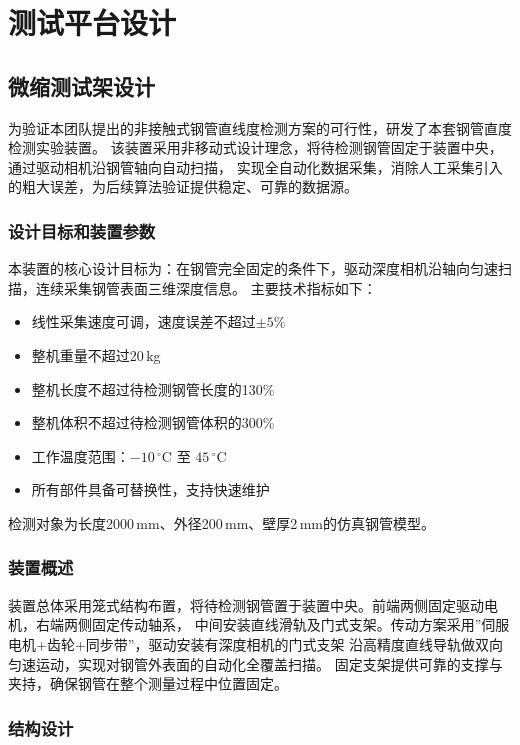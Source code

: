 \documentclass{article}
\begin{document}
\section{测试平台设计}

\subsection{微缩测试架设计}
为验证本团队提出的非接触式钢管直线度检测方案的可行性，研发了本套钢管直度检测实验装置。
该装置采用非移动式设计理念，将待检测钢管固定于装置中央，通过驱动相机沿钢管轴向自动扫描，
实现全自动化数据采集，消除人工采集引入的粗大误差，为后续算法验证提供稳定、可靠的数据源。

\subsubsection{设计目标和装置参数}

本装置的核心设计目标为：在钢管完全固定的条件下，驱动深度相机沿轴向匀速扫描，连续采集钢管表面三维深度信息。
主要技术指标如下：

\begin{itemize}
    \item 线性采集速度可调，速度误差不超过$\pm5\%$
    \item 整机重量不超过20\,kg
    \item 整机长度不超过待检测钢管长度的130\%
    \item 整机体积不超过待检测钢管体积的300\%
    \item 工作温度范围：$-10\,^\circ\text{C}$ 至 $45\,^\circ\text{C}$
    \item 所有部件具备可替换性，支持快速维护
\end{itemize}

检测对象为长度2000\,mm、外径200\,mm、壁厚2\,mm的仿真钢管模型。

\subsubsection{装置概述}

装置总体采用笼式结构布置，将待检测钢管置于装置中央。前端两侧固定驱动电机，右端两侧固定传动轴系，
中间安装直线滑轨及门式支架。传动方案采用”伺服电机+齿轮+同步带”，驱动安装有深度相机的门式支架
沿高精度直线导轨做双向匀速运动，实现对钢管外表面的自动化全覆盖扫描。
固定支架提供可靠的支撑与夹持，确保钢管在整个测量过程中位置固定。

\subsubsection{结构设计}
\end{document}
